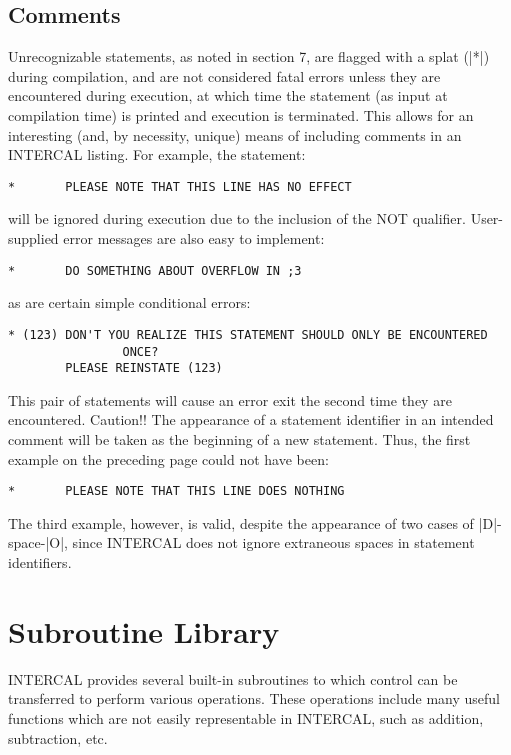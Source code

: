\subsection{Comments}

Unrecognizable statements, as noted in section 7, are flagged with a splat
(|*|) during compilation, and are not considered fatal errors unless they
are encountered during execution, at which time the statement (as input at
compilation time) is printed and execution is terminated.  This allows for
an interesting (and, by necessity, unique) means of including comments in
an INTERCAL listing.  For example, the statement:

\begin{verbatim}
*       PLEASE NOTE THAT THIS LINE HAS NO EFFECT
\end{verbatim}
will be ignored during execution due to the inclusion of the NOT qualifier.
User-supplied error messages are also easy to implement:

\begin{verbatim}
*       DO SOMETHING ABOUT OVERFLOW IN ;3
\end{verbatim}
as are certain simple conditional errors:

\begin{verbatim}
* (123) DON'T YOU REALIZE THIS STATEMENT SHOULD ONLY BE ENCOUNTERED
                ONCE?
        PLEASE REINSTATE (123)
\end{verbatim}
This pair of statements will cause an error exit the second time they are
encountered.  Caution!!  The appearance of a statement identifier in an
intended comment will be taken as the beginning of a new statement.  Thus,
the first example on the preceding page could not have been:

\begin{verbatim}
*       PLEASE NOTE THAT THIS LINE DOES NOTHING
\end{verbatim}
The third example, however, is valid, despite the appearance of two cases
of |D|-space-|O|, since INTERCAL does not ignore extraneous spaces in
statement identifiers.






\section{Subroutine Library}

INTERCAL provides several built-in subroutines to which control can be
transferred to perform various operations.  These operations include many
useful functions which are not easily representable in INTERCAL, such as
addition, subtraction, etc.

